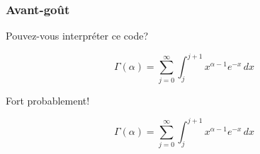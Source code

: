 
\begin{frame}[fragile]

	\frametitle{Avant-goût}
	
	Pouvez-vous interpréter ce code?
	
	\begin{codesource}
	\begin{equation*}
		\Gamma(\alpha) =
		\sum_{j = 0}^\infty \int_j^{j + 1}
		x^{\alpha - 1} e^{-x}\, dx
	\end{equation*}
	\end{codesource}

	Fort probablement!
	
	\begin{equation*}
		\Gamma(\alpha) =
		\sum_{j = 0}^\infty \int_j^{j + 1}
		x^{\alpha - 1} e^{-x}\, dx
	\end{equation*}
\end{frame}